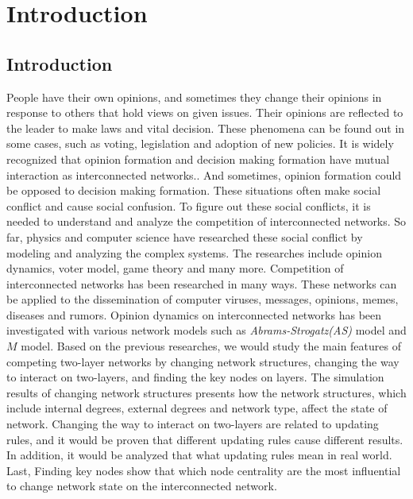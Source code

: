 
\chapter{Introduction}
\label{chap:intro}
\section{Introduction}
People have their own opinions, and sometimes they change their opinions in response to others that hold views on given issues. Their opinions are reflected to the leader to make laws and vital decision. These phenomena can be found out  in some cases, such as voting, legislation and adoption of new policies. It is widely recognized that opinion formation and decision making formation have mutual interaction as interconnected networks.\parencite{mikko2014, danziger2019, newman2010, boccaletti2014, domenico2013, tomasini2015, namkhanhvu2017}. And sometimes, opinion formation could be opposed to decision making formation. These situations often make social conflict and cause social confusion. To figure out these social conflicts, it is needed to understand and analyze the competition of interconnected networks. So far, physics and computer science have researched these social conflict by modeling and analyzing the complex systems\parencite{fangwu2004, zuev2012, laguna2004, masuda2014}. The researches include opinion dynamics, voter model, game theory and many more\parencite{bianconi2018}. 
Competition of interconnected networks has been researched in many ways. These networks can be applied to the dissemination of computer viruses, messages, opinions, memes, diseases and rumors\parencite{hua2014,shenyu2018, zhou2018, alvarez2016,gomez2015,diep2017,rocca2014,velasquez2018}. Opinion dynamics on interconnected networks has been investigated with various network models such as \textit{Abrams-Strogatz(AS)} model\parencite{abrams2003,vazquez2010} and $M$ model\parencite{rocca2014}.  Based on the previous researches, we would study the main features of competing two-layer networks by changing network structures, changing the way to interact on two-layers, and finding the key nodes on layers. The simulation results of changing network structures presents how the network structures, which include internal degrees, external degrees and network type, affect the state of network. Changing the way to interact on two-layers are related to updating rules, and it would be proven that different updating rules cause different results. In addition, it would be analyzed that what updating rules mean in real world. Last, Finding key nodes show that which node centrality are the most influential to change network state on the interconnected network. 
